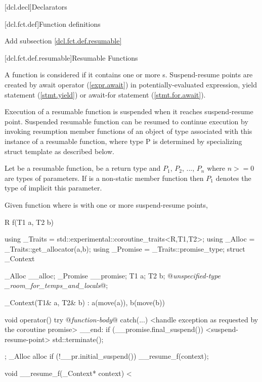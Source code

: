 
[dcl.decl]{Declarators}

\setcounter{section}{3}
[dcl.fct.def]{Function definitions}

Add subsection \ref{dcl.fct.def.resumable}

\setcounter{subsection}{3}
[dcl.fct.def.resumable]{Resumable Functions}

\pnum
A function is considered  if it contains
one or more s. 
Suspend-resume points are created by await operator (\ref{expr.await}) in potentially-evaluated expression, yield statement (\ref{stmt.yield}) 
or await-for statement (\ref{stmt.for.await}).

\pnum
Execution of a resumable function is suspended when it reaches suspend-resume point.
Suspended resumable function can be resumed
to continue execution by invoking
resumption member functions of an object of  type
associated with this instance of a resumable function, where type P
is determined by specializing struct template  as described below. 

\pnum
Let  be a resumable function,  be a return type and $P_1$, $P_2$, ..., $P_n$
where $n >= 0$ are types of parameters. If  is a non-static member function then $P_1$ denotes the type of implicit this parameter.

\pnum Given function  where  is  with one or more suspend-resume points, 

\begin{codeblock}
	R f(T1 a, T2 b) {
		using _Traits = std::experimental::coroutine_traits<R,T1,T2>;
		using _Alloc = _Traits::get_allocator(a,b);
		using _Promise = _Traits::promise_type;
		struct _Context {
			_Alloc __alloc;
			_Promise __promise;
			T1 a;
			T2 b;
			@\textit{unspecified-type _room_for_temps_and_locals}@;
			
			_Context(T1& a, T2& b) : a(move(a)), b(move(b)) {}
			
			void operator() {
				try { 
					@\textit{function-body}@ 
				} catch(...) {
					<handle exception as requested by the coroutine promise>
				}
				__end:  
				if (__promise.final_suspend()) {
					<suspend-resume-point>
					std::terminate();
				}			
			}
		};
		_Alloc alloc
		if (!__pr.initial_suspend()) {
			__resume_f(context);
		}
	}
	
	void __resume_f(_Context* context) {
	<
}
\end{codeblock}

%
